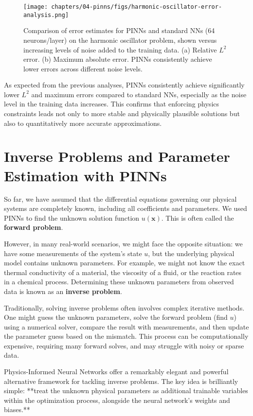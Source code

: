 \begin{figure}[htbp]
    \centering
    \texttt{[image: chapters/04-pinns/figs/harmonic-oscillator-error-analysis.png]}
    \caption{Comparison of error estimates for PINNs and standard NNs (64 neurons/layer) on the harmonic oscillator problem, shown versus increasing levels of noise added to the training data. (a) Relative $L^2$ error. (b) Maximum absolute error. PINNs consistently achieve lower errors across different noise levels.}
    \label{fig:error_estimates}
\end{figure}

As expected from the previous analyses, PINNs consistently achieve significantly lower $L^2$ and maximum errors compared to standard NNs, especially as the noise level in the training data increases. This confirms that enforcing physics constraints leads not only to more stable and physically plausible solutions but also to quantitatively more accurate approximations.


\section{Inverse Problems and Parameter Estimation with PINNs}
\label{sec:inverse_problems}

So far, we have assumed that the differential equations governing our physical systems are completely known, including all coefficients and parameters. We used PINNs to find the unknown solution function $u(\mathbf{x})$. This is often called the \textbf{forward problem}.

However, in many real-world scenarios, we might face the opposite situation: we have some measurements of the system's state $u$, but the underlying physical model contains unknown parameters. For example, we might not know the exact thermal conductivity of a material, the viscosity of a fluid, or the reaction rates in a chemical process. Determining these unknown parameters from observed data is known as an \textbf{inverse problem}.

Traditionally, solving inverse problems often involves complex iterative methods. One might guess the unknown parameters, solve the forward problem (find $u$) using a numerical solver, compare the result with measurements, and then update the parameter guess based on the mismatch. This process can be computationally expensive, requiring many forward solves, and may struggle with noisy or sparse data.

Physics-Informed Neural Networks offer a remarkably elegant and powerful alternative framework for tackling inverse problems. The key idea is brilliantly simple: **treat the unknown physical parameters as additional trainable variables within the optimization process, alongside the neural network's weights and biases.**

